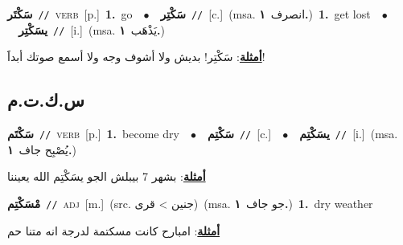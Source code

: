 \documentclass[10pt,a4paper,twoside]{article} %
\begin{document}
\begin{multicols}{2}
{\setlength\topsep{0pt}\textbf{\foreignlanguage{arabic}{سَكْتَر}}\ {\color{gray}\texttt{//}\color{black}}\ \textsc{verb}\ [p.]\ \textbf{1.}~go\ \ $\bullet$\ \ \setlength\topsep{0pt}\textbf{\foreignlanguage{arabic}{سَكْتِر}}\ {\color{gray}\texttt{//}\color{black}}\ [c.]\ \color{gray}(msa. \foreignlanguage{arabic}{انصرف}~\foreignlanguage{arabic}{\textbf{١.}})\color{black}\ \textbf{1.}~get lost\ \ $\bullet$\ \ \setlength\topsep{0pt}\textbf{\foreignlanguage{arabic}{يسَكْتِر}}\ {\color{gray}\texttt{//}\color{black}}\ [i.]\ \color{gray}(msa. \foreignlanguage{arabic}{يَذْهَب}~\foreignlanguage{arabic}{\textbf{١.}})\color{black}\  \begin{flushright}\color{gray}\foreignlanguage{arabic}{\textbf{\underline{\foreignlanguage{arabic}{أمثلة}}}: سَكْتِر! بديش ولا أشوف وجه ولا أسمع صوتك أبداََ!}\end{flushright}\color{black}} \vspace{2mm}

\vspace{-3mm}
\subsection*{\color{blue}\foreignlanguage{arabic}{س.ك.ت.م}\color{blue}{}} 

{\setlength\topsep{0pt}\textbf{\foreignlanguage{arabic}{سَكْتَم}}\ {\color{gray}\texttt{//}\color{black}}\ \textsc{verb}\ [p.]\ \textbf{1.}~become dry\ \ $\bullet$\ \ \setlength\topsep{0pt}\textbf{\foreignlanguage{arabic}{سَكْتِم}}\ {\color{gray}\texttt{//}\color{black}}\ [c.]\ \ $\bullet$\ \ \setlength\topsep{0pt}\textbf{\foreignlanguage{arabic}{يسَكْتِم}}\ {\color{gray}\texttt{//}\color{black}}\ [i.]\ \color{gray}(msa. \foreignlanguage{arabic}{يُصْبِح جاف}~\foreignlanguage{arabic}{\textbf{١.}})\color{black}\  \begin{flushright}\color{gray}\foreignlanguage{arabic}{\textbf{\underline{\foreignlanguage{arabic}{أمثلة}}}: بشهر 7 بيبلش الجو يسَكْتِم الله يعيننا}\end{flushright}\color{black}} \vspace{2mm}

{\setlength\topsep{0pt}\textbf{\foreignlanguage{arabic}{مْسَكْتِم}}\ {\color{gray}\texttt{//}\color{black}}\ \textsc{adj}\ [m.]\ (src. \color{gray}\foreignlanguage{arabic}{جنين > قرى}\color{black})\ \color{gray}(msa. \foreignlanguage{arabic}{جو جاف}~\foreignlanguage{arabic}{\textbf{١.}})\color{black}\ \textbf{1.}~dry weather\  \begin{flushright}\color{gray}\foreignlanguage{arabic}{\textbf{\underline{\foreignlanguage{arabic}{أمثلة}}}: امبارح كانت مسكتمة لدرجة انه متنا حم}\end{flushright}\color{black}} \vspace{2mm}


\end{multicols}
\end{document}
